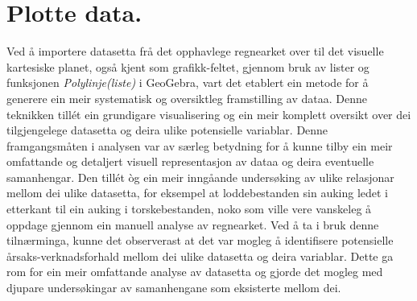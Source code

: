 \documentclass{report}
\begin{document}
\section{Plotte data.}
Ved å importere datasetta frå det opphavlege regnearket over til det visuelle kartesiske planet, også kjent som grafikk-feltet, gjennom bruk av lister og funksjonen \textit{Polylinje(liste)} i GeoGebra, vart det etablert ein metode for å generere ein meir systematisk og oversiktleg framstilling av dataa. Denne teknikken tillét ein grundigare visualisering og ein meir komplett oversikt over dei tilgjengelege datasetta og deira ulike potensielle variablar.
Denne framgangsmåten i analysen var av særleg betydning for å kunne tilby ein meir omfattande og detaljert visuell representasjon av dataa og deira eventuelle samanhengar. Den tillét òg ein meir inngåande undersøking av ulike relasjonar mellom dei ulike datasetta, for eksempel at loddebestanden sin auking ledet i etterkant til ein auking i torskebestanden, noko som ville vere vanskeleg å oppdage gjennom ein manuell analyse av regnearket.
Ved å ta i bruk denne tilnærminga, kunne det observerast at det var mogleg å identifisere potensielle årsaks-verknadsforhald mellom dei ulike datasetta og deira variablar. Dette ga rom for ein meir omfattande analyse av datasetta og gjorde det mogleg med djupare undersøkingar av samanhengane som eksisterte mellom dei.
\end{document}
